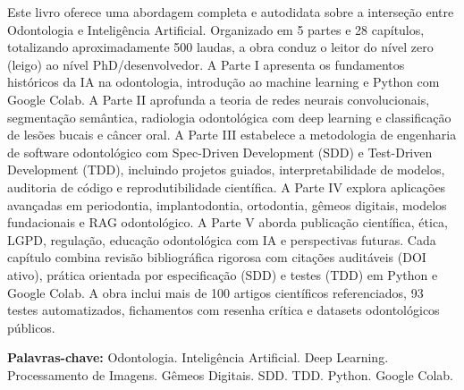 
\begin{resumo}

Este livro oferece uma abordagem completa e autodidata sobre a interseção entre Odontologia e Inteligência Artificial. Organizado em 5 partes e 28 capítulos, totalizando aproximadamente 500 laudas, a obra conduz o leitor do nível zero (leigo) ao nível PhD/desenvolvedor. A Parte I apresenta os fundamentos históricos da IA na odontologia, introdução ao machine learning e Python com Google Colab. A Parte II aprofunda a teoria de redes neurais convolucionais, segmentação semântica, radiologia odontológica com deep learning e classificação de lesões bucais e câncer oral. A Parte III estabelece a metodologia de engenharia de software odontológico com Spec-Driven Development (SDD) e Test-Driven Development (TDD), incluindo projetos guiados, interpretabilidade de modelos, auditoria de código e reprodutibilidade científica. A Parte IV explora aplicações avançadas em periodontia, implantodontia, ortodontia, gêmeos digitais, modelos fundacionais e RAG odontológico. A Parte V aborda publicação científica, ética, LGPD, regulação, educação odontológica com IA e perspectivas futuras. Cada capítulo combina revisão bibliográfica rigorosa com citações auditáveis (DOI ativo), prática orientada por especificação (SDD) e testes (TDD) em Python e Google Colab. A obra inclui mais de 100 artigos científicos referenciados, 93 testes automatizados, fichamentos com resenha crítica e datasets odontológicos públicos.

\textbf{Palavras-chave:} Odontologia. Inteligência Artificial. Deep Learning. Processamento de Imagens. Gêmeos Digitais. SDD. TDD. Python. Google Colab.
\end{resumo}
